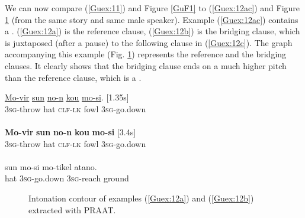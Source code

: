 \documentclass[output=paper]{LSP/langsci}
\begin{document}
We can now compare (\ref{Guex:11}) and Figure \ref{GuF1} to (\ref{Guex:12ac}) and Figure \ref{GuF2} (from the same story and same male speaker). Example (\ref{Guex:12ac}) contains a . (\ref{Guex:12a}) is the reference clause, (\ref{Guex:12b}) is the bridging clause, which is juxtaposed (after a pause) to the following clause in (\ref{Guex:12c}). The graph accompanying this example (Fig. \ref{GuF2}) represents the reference and the bridging clauses. It clearly shows that the bridging clause ends on a much higher pitch than the reference clause, which is a .


\begin{exe}
\ex \label{Guex:12ac}
\begin{xlist}
\ex \label{Guex:12a}
\gll \underline{Mo-vir}        \underline{sun}   \underline{no-n}          \underline{kou}   \underline{mo-si}. [1.35s]\\
\textsc{3sg}-throw   hat   \textsc{clf-lk}   fowl   \textsc{3sg}-go.down \\
\glt {}\\
\ex \label{Guex:12b}
\gll \textbf{Mo-vir}      \textbf{sun}    \textbf{no-n}           \textbf{kou}    \textbf{mo-si} [3.4s] \\
\textsc{3sg}-throw   hat   \textsc{clf-lk}   fowl   \textsc{3sg}-go.down\\
\glt {}\\
\ex \label{Guex:12c}
\gll sun    mo-si          mo-tikel        atano.\\     	       
hat    \textsc{3sg}-go.down   \textsc{3sg}-reach     ground\\
\glt {} 
\end{xlist}
\end{exe}

\begin{figure}[ht]
\caption{Intonation contour of examples (\ref{Guex:12a}) and (\ref{Guex:12b}) extracted with PRAAT. \label{GuF2}}
\end{figure}
\end{document}
